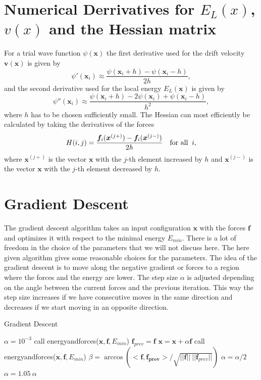\documentclass [12pt]{report}
\begin{document}
\begin{appendices}
\chapter{Numerical Derrivatives for $E_L(x)$, $v(x)$ and the Hessian matrix} \label{appendixC}
For a trial wave function $\psi(\bm{x})$ the first derivative used for the drift velocity $\bm{v}(\bm{x})$ is given by
\begin{equation}
\psi'(\bm{x}_i) \approx \frac{\psi(\bm{x}_i + h) - \psi(\bm{x}_i - h)}{2h},
\end{equation}
and the second derivative used for the local energy $E_L(\bm{x})$ is given by
\begin{equation}
\psi''(\bm{x}_i) \approx \frac{\psi(\bm{x}_i + h) - 2 \psi(\bm{x}_i) + \psi(\bm{x}_i - h)}{h^2},
\end{equation}
where $h$ has to be chosen sufficiently small.
The Hessian can most efficiently be calculated by taking the derivatives of the forces
\begin{equation}
H(i,j) = \frac{\bm{f}_i(\bm{x}^{(j+)}) - \bm{f}_i(\bm{x}^{(j-)})}{2h} \mbox{\quad for all \:} i,
\end{equation}
where $\bm{x}^{(j+)}$ is the vector $\bm{x}$ with the $j$-th element increased by $h$ and $\bm{x}^{(j-)}$ is the vector $\bm{x}$ with the $j$-th element decreased by $h$.
\chapter{Gradient Descent} \label{gradient_descent}
The gradient descent algorithm takes an input configuration $\bm{x}$ with the forces $\bm{f}$ and optimizes it with respect to the minimal energy $E_{min}$. There is a lot of freedom in the choice of the parameters that we will not discuss here. The here given algorithm gives some reasonable choices for the parameters. The idea of the gradient descent is to move along the negative gradient or forces to a region where the forces and the energy are lower. The step size $\alpha$ is adjusted depending on the angle between the current forces and the previous iteration. This way the step size increases if we have consecutive moves in the same direction and decreases if we start moving in an opposite direction. 
\begin{algorithm}
\caption{Gradient Descent}\label{grad_desc}
\begin{algorithmic}[1]
 
\State $\alpha = 10^{-3}$
\State call energyandforces($\bm{x}, \bm{f}, E_{min}$)
 
	\State $\bm{f}_{prev} = \bm{f}$	
	\State $\bm{x} = \bm{x} + \alpha \bm{f}$
	\State call energyandforces($\bm{x}, \bm{f}, E_{min}$)
	\State $\beta = \arccos{(<\bm{f},\bm{f_{prev}}>/\sqrt{||\bm{f}||\:||\bm{f}_{prev}||})}$ 
	 
		\State $\alpha = \alpha/2$
	\Else
		\State $\alpha = 1.05\ \alpha$
	\EndIf
\EndWhile
\EndProcedure
\end{algorithmic}
\end{algorithm}
\end{appendices}



\end{document}
